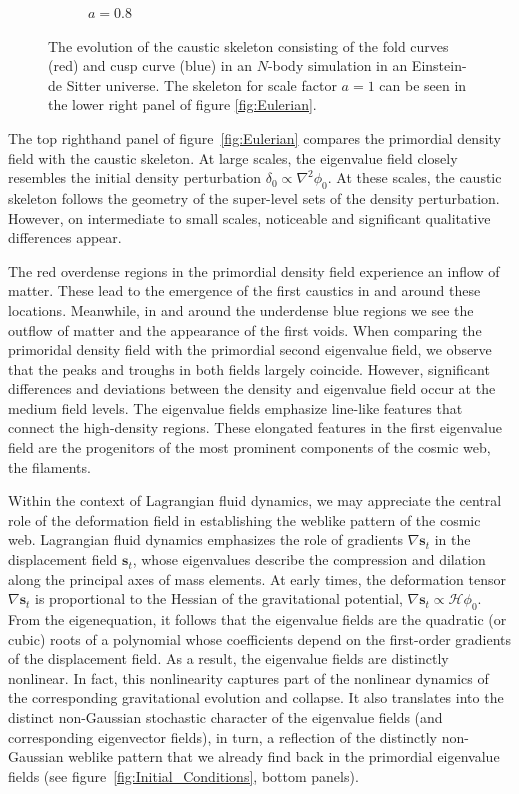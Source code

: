 \documentclass[a4paper, 11pt]{article}
\begin{document}
\begin{figure}
\begin{subfigure}[b]{0.49\textwidth}
\caption{$a=0.8$}
\end{subfigure}
\caption{The evolution of the caustic skeleton consisting of the fold curves (red) and cusp curve (blue) in an $N$-body simulation in an Einstein-de Sitter universe. The skeleton for scale factor $a=1$ can be seen in the lower right panel of figure \ref{fig:Eulerian}.}
\label{fig:Eulerian_Evolution}
\end{figure}

\bigskip
The top righthand panel of figure~\ref{fig:Eulerian} compares the primordial density field with the caustic skeleton. At large scales, the eigenvalue field closely resembles the initial density perturbation $\delta_0 \propto \nabla^2\phi_0$. At these scales, the caustic skeleton follows the geometry of the super-level sets of the density perturbation. However, on intermediate to small scales, noticeable and significant qualitative differences appear. 

The red overdense regions in the primordial density field experience an inflow of matter. These lead to the emergence of the first caustics in and around these locations. Meanwhile, in and around the underdense blue regions we see the outflow of matter and the appearance of the first voids. When comparing the primoridal density field with the primordial second eigenvalue field, we observe that the peaks and troughs in both fields largely coincide. However, significant differences and deviations between the density and eigenvalue field occur at the medium field levels. The eigenvalue fields emphasize line-like features that connect the high-density regions. These elongated features in the first eigenvalue field are the progenitors of the most prominent components of the cosmic web, the filaments. 

Within the context of Lagrangian fluid dynamics, we may appreciate the central role of the deformation field in establishing the weblike pattern of the cosmic web. Lagrangian fluid dynamics emphasizes the role of gradients $\nabla \bm{s}_t$ in the displacement field $\bm{s}_t$, whose eigenvalues describe the compression and dilation along the principal axes of mass elements. At early times, the deformation tensor $\nabla \bm{s}_t$ is proportional to the Hessian of the gravitational potential, $\nabla \bm{s}_t \propto \mathcal{H}\phi_0$. From the eigenequation, it follows that the eigenvalue fields are the quadratic (or cubic) roots of a polynomial whose coefficients depend on the first-order gradients of the displacement field. As a result, the eigenvalue fields are distinctly nonlinear. In fact, this nonlinearity captures part of the nonlinear dynamics of the corresponding gravitational evolution and collapse. It also translates into the distinct non-Gaussian stochastic character of the eigenvalue fields (and corresponding eigenvector fields), in turn, a reflection of the distinctly non-Gaussian weblike pattern that we already find back in the primordial eigenvalue fields (see figure~\ref{fig:Initial_Conditions}, bottom panels).
\end{document}
